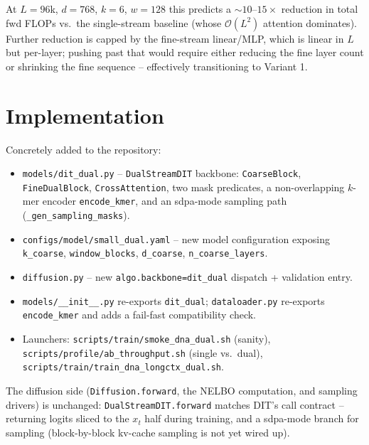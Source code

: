 \documentclass[11pt,a4paper]{article}
\begin{document}
At \(L\!=\!96\)k, \(d\!=\!768\), \(k\!=\!6\), \(w\!=\!128\) this predicts a
\(\sim 10\text{--}15\times\) reduction in total fwd FLOPs vs.\ the
single-stream baseline (whose \(\mathcal{O}(L^2)\) attention dominates).
Further reduction is capped by the fine-stream linear/MLP, which is linear in
\(L\) but per-layer; pushing past that would require either reducing the
fine layer count or shrinking the fine sequence -- effectively transitioning
to Variant 1.

\section{Implementation}

Concretely added to the repository:
\begin{itemize}
  \item \texttt{models/dit\_dual.py} -- \texttt{DualStreamDIT} backbone:
        \texttt{CoarseBlock}, \texttt{FineDualBlock}, \texttt{CrossAttention},
        two mask predicates, a non-overlapping \(k\)-mer encoder
        \texttt{encode\_kmer}, and an sdpa-mode sampling path
        (\texttt{\_gen\_sampling\_masks}).
  \item \texttt{configs/model/small\_dual.yaml} -- new model configuration
        exposing \texttt{k\_coarse}, \texttt{window\_blocks},
        \texttt{d\_coarse}, \texttt{n\_coarse\_layers}.
  \item \texttt{diffusion.py} -- new
        \texttt{algo.backbone=dit\_dual} dispatch + validation entry.
  \item \texttt{models/\_\_init\_\_.py} re-exports \texttt{dit\_dual};
        \texttt{dataloader.py} re-exports \texttt{encode\_kmer} and adds
        a fail-fast compatibility check.
  \item Launchers: \texttt{scripts/train/smoke\_dna\_dual.sh} (sanity),
        \texttt{scripts/profile/ab\_throughput.sh} (single vs.\ dual),
        \texttt{scripts/train/train\_dna\_longctx\_dual.sh}.
\end{itemize}

The diffusion side (\texttt{Diffusion.forward}, the NELBO computation, and
sampling drivers) is unchanged: \texttt{DualStreamDIT.forward} matches DIT's
call contract -- returning logits sliced to the \(x_t\) half during training,
and a sdpa-mode branch for sampling (block-by-block kv-cache sampling is not
yet wired up).
\end{document}
